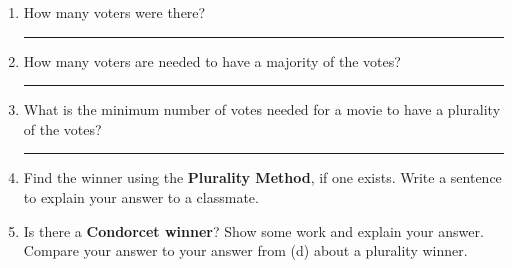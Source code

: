 \documentclass[12pt]{article}
\newcommand{\ans}[1][1in]{\rule{#1}{.5pt}}
\begin{document}
\begin{enumerate}
\begin{enumerate}
\item How many voters were there? \ans
\item How many voters are needed  to have a majority of the votes? \ans
\vspace{1 cm}
\item What is the minimum number of votes needed for a movie to have a plurality of the votes? \ans
\vspace{1 cm}
\item Find the winner using the {\bf Plurality Method}, if one exists. Write a sentence to explain your answer to a classmate.
\vspace{1 cm}
  



\item Is there a {\bf Condorcet winner}? Show some work and explain your answer. Compare your answer to your answer from (d) about a plurality winner.

\vfill

\vfill

\vfill

\end{enumerate}

\end{enumerate}
\end{document}
